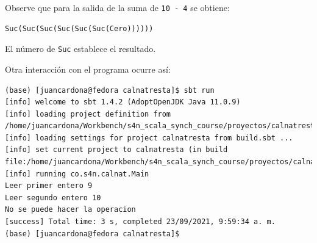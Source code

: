\documentclass[12pt]{article}
\begin{document}
Observe que para la salida de la suma de \texttt{10 - 4} se obtiene:

\begin{verbatim}
Suc(Suc(Suc(Suc(Suc(Suc(Cero))))))
\end{verbatim}

El número de \texttt{Suc} establece el resultado.

Otra interacción con el programa ocurre así:

\begin{verbatim}
(base) [juancardona@fedora calnatresta]$ sbt run
[info] welcome to sbt 1.4.2 (AdoptOpenJDK Java 11.0.9)
[info] loading project definition from /home/juancardona/Workbench/s4n_scala_synch_course/proyectos/calnatresta/project
[info] loading settings for project calnatresta from build.sbt ...
[info] set current project to calnatresta (in build file:/home/juancardona/Workbench/s4n_scala_synch_course/proyectos/calnatresta/)
[info] running co.s4n.calnat.Main 
Leer primer entero 9
Leer segundo entero 10
No se puede hacer la operacion
[success] Total time: 3 s, completed 23/09/2021, 9:59:34 a. m.
(base) [juancardona@fedora calnatresta]$ 
\end{verbatim}
% 
% 
\end{document}

